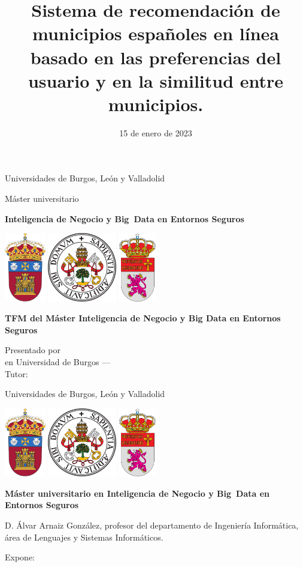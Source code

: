 \documentclass[a4paper,12pt,twoside]{memoir}
\title{Sistema de recomendación de municipios españoles en línea basado en las preferencias del usuario y en la similitud entre municipios.}
\author{\nombre}
\date{15 de enero de 2023}
\makeatletter
\def\maketitle{
  \null
  \thispagestyle{empty}
\begin{center}%
	{\noindent\Huge Universidades de Burgos, León y Valladolid}\vspace{.5cm}%
	
	{\noindent\Large Máster universitario}\vspace{.5cm}%
	
	{\noindent\Huge \textbf{Inteligencia de Negocio y Big~Data en Entornos Seguros}}\vspace{.5cm}%
\end{center}%

\begin{center}%
	\includegraphics[height=3cm]{img/escudoUBU} \hspace{1cm}
	\includegraphics[height=3cm]{img/escudoUVA} \hspace{1cm}
	\includegraphics[height=3cm]{img/escudoULE} \vspace{1cm}%
\end{center}%

  \vfill
  \colorbox{cpardoBox}{%
    \begin{minipage}{.9\textwidth}
      \vspace{.1cm}\Large
      \begin{center}
      \textbf{TFM del Máster Inteligencia de Negocio y Big Data en Entornos Seguros}\vspace{.6cm}\\
      \textbf{\large\@title{}}
      \end{center}
      \vspace{.2cm}
    \end{minipage}

  }%
  \hfill
  \vfill
  \begin{center}%
  {%
    \noindent\large
    Presentado por \@author{}\\ 
    en Universidad de Burgos --- \@date{}\\
    Tutor: \@tutor{}\\
  }%
  \end{center}%
  \null
  \cleardoublepage
  }
\makeatother
\begin{document}
\maketitle

\newpage\null\thispagestyle{empty}\newpage

\thispagestyle{empty}


\noindent
\begin{center}%
	{\noindent\Huge Universidades de Burgos, León y Valladolid}\vspace{.5cm}%
	
\begin{center}%
	\includegraphics[height=3cm]{img/escudoUBU} \hspace{1cm}
	\includegraphics[height=3cm]{img/escudoUVA} \hspace{1cm}
	\includegraphics[height=3cm]{img/escudoULE} \vspace{1cm}%
\end{center}%

	{\noindent\Large \textbf{Máster universitario en Inteligencia de Negocio y Big~Data en Entornos Seguros}}\vspace{.5cm}%
\end{center}%

\noindent D. Álvar Arnaiz González, profesor del departamento de Ingeniería Informática, área de Lenguajes y Sistemas Informáticos.

\noindent Expone:
\end{document}
